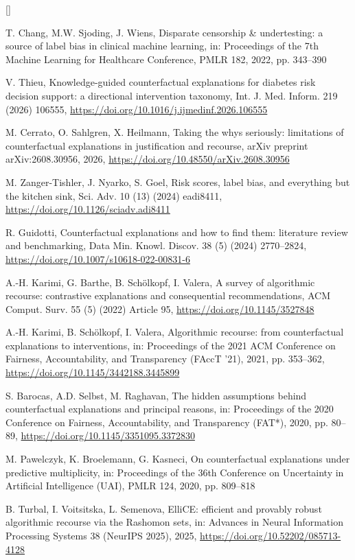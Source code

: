 \documentclass[9pt,a4paper]{extarticle}
\newcounter{refc}
\begin{document}
{\begin{list}{[]}{\setlength{\leftmargin}{2.2em}\setlength{\labelwidth}{2em}\setlength{\itemsep}{0.5pt}\setlength{\parsep}{0pt}}
\item T. Chang, M.W. Sjoding, J. Wiens, Disparate censorship \& undertesting: a source of label bias in clinical machine learning, in: Proceedings of the 7th Machine Learning for Healthcare Conference, PMLR 182, 2022, pp. 343–390
\item V. Thieu, Knowledge-guided counterfactual explanations for diabetes risk decision support: a directional intervention taxonomy, Int. J. Med. Inform. 219 (2026) 106555, \url{https://doi.org/10.1016/j.ijmedinf.2026.106555}
\item M. Cerrato, O. Sahlgren, X. Heilmann, Taking the whys seriously: limitations of counterfactual explanations in justification and recourse, arXiv preprint arXiv:2608.30956, 2026, \url{https://doi.org/10.48550/arXiv.2608.30956}
\item M. Zanger-Tishler, J. Nyarko, S. Goel, Risk scores, label bias, and everything but the kitchen sink, Sci. Adv. 10 (13) (2024) eadi8411, \url{https://doi.org/10.1126/sciadv.adi8411}
\item R. Guidotti, Counterfactual explanations and how to find them: literature review and benchmarking, Data Min. Knowl. Discov. 38 (5) (2024) 2770–2824, \url{https://doi.org/10.1007/s10618-022-00831-6}
\item A.-H. Karimi, G. Barthe, B. Schölkopf, I. Valera, A survey of algorithmic recourse: contrastive explanations and consequential recommendations, ACM Comput. Surv. 55 (5) (2022) Article 95, \url{https://doi.org/10.1145/3527848}
\item A.-H. Karimi, B. Schölkopf, I. Valera, Algorithmic recourse: from counterfactual explanations to interventions, in: Proceedings of the 2021 ACM Conference on Fairness, Accountability, and Transparency (FAccT ’21), 2021, pp. 353–362, \url{https://doi.org/10.1145/3442188.3445899}
\item S. Barocas, A.D. Selbst, M. Raghavan, The hidden assumptions behind counterfactual explanations and principal reasons, in: Proceedings of the 2020 Conference on Fairness, Accountability, and Transparency (FAT*), 2020, pp. 80–89, \url{https://doi.org/10.1145/3351095.3372830}
\item M. Pawelczyk, K. Broelemann, G. Kasneci, On counterfactual explanations under predictive multiplicity, in: Proceedings of the 36th Conference on Uncertainty in Artificial Intelligence (UAI), PMLR 124, 2020, pp. 809–818
\item B. Turbal, I. Voitsitska, L. Semenova, ElliCE: efficient and provably robust algorithmic recourse via the Rashomon sets, in: Advances in Neural Information Processing Systems 38 (NeurIPS 2025), 2025, \url{https://doi.org/10.52202/085713-4128}

\end{list}}
\end{document}
